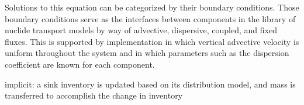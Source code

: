 Solutions to this equation can be categorized by their boundary conditions.  
Those boundary conditions serve as the interfaces between components in the 
\Cyder library of nuclide transport models by way of advective, dispersive, 
coupled, and fixed fluxes.  This is supported by implementation in which 
vertical advective velocity is uniform throughout the system and in which 
parameters such as the dispersion coefficient are known for each component. 


  implicit: a sink inventory is updated based on its distribution model, and 
  mass is transferred to accomplish the change in inventory


